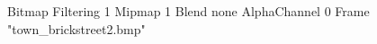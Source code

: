 {Bitmap
	{Filtering 1}
	{Mipmap 1}
	{Blend none}
	{AlphaChannel 0}
	{Frame "town_brickstreet2.bmp"}
}
